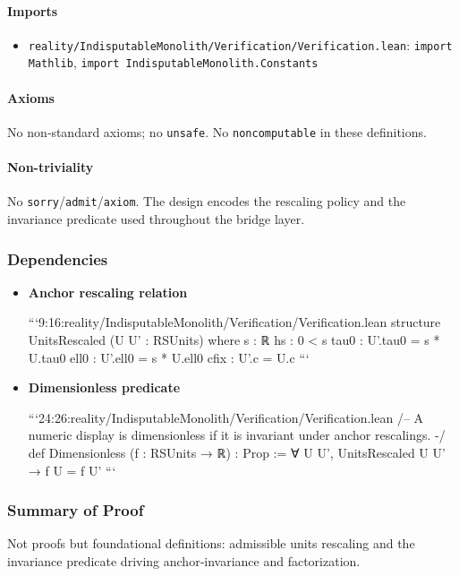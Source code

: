 \documentclass{article}
\newcommand{\FileRef}[1]{\texttt{#1}}
\begin{document}
\paragraph{Imports}
\begin{itemize}[leftmargin=*]
  \item \FileRef{reality/IndisputableMonolith/Verification/Verification.lean}: \texttt{import Mathlib}, \texttt{import IndisputableMonolith.Constants}
\end{itemize}

\paragraph{Axioms}
No non‑standard axioms; no \texttt{unsafe}. No \texttt{noncomputable} in these definitions.

\paragraph{Non-triviality}
No \texttt{sorry}/\texttt{admit}/\texttt{axiom}. The design encodes the rescaling policy and the invariance predicate used throughout the bridge layer.

\subsubsection{Dependencies}
\begin{itemize}[leftmargin=*]
  \item \textbf{Anchor rescaling relation}

```9:16:reality/IndisputableMonolith/Verification/Verification.lean
structure UnitsRescaled (U U' : RSUnits) where
  s    : ℝ
  hs   : 0 < s
  tau0 : U'.tau0 = s * U.tau0
  ell0 : U'.ell0 = s * U.ell0
  cfix : U'.c = U.c
```

  \item \textbf{Dimensionless predicate}

```24:26:reality/IndisputableMonolith/Verification/Verification.lean
/-- A numeric display is dimensionless if it is invariant under anchor rescalings. -/
 def Dimensionless (f : RSUnits → ℝ) : Prop := ∀ {U U'}, UnitsRescaled U U' → f U = f U'
```
\end{itemize}

\subsubsection{Summary of Proof}
Not proofs but foundational definitions: admissible units rescaling and the invariance predicate driving anchor‑invariance and factorization.
\end{document}
